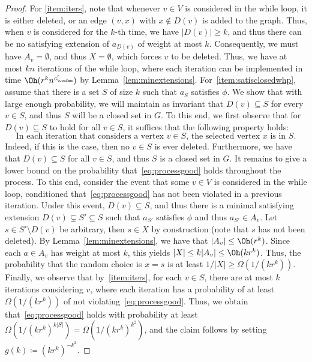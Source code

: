 \begin{proof}
For \ref{item:iters}, note that whenever $v\in V$ is considered in the while loop, it is either deleted, or an edge $(v,x)$ with $x\notin D(v)$ is added to the graph. Thus, when $v$ is considered for the $k$-th time, we have $|D(v)|\ge k$, and thus there can be no satisfying extension of $a_{D(v)}$ of weight at most $k$. Consequently, we must have $A_v=\emptyset$, and thus $X=\emptyset$, which forces $v$ to be deleted. Thus, we have at most $kn$ iterations of the while loop, where each iteration can be implemented in time $\Oh(r^k n^{c'_\confam})$ by Lemma~\ref{lem:minextensions}.
%
For~\ref{item:satisclosedwhp}, assume that there is a set $S$ of size $k$ such that $a_S$ satisfies $\phi$. We show that with large enough probability, we will maintain as invariant that $D(v)\subseteq S$ for every $v\in S$, and thus $S$ will be a closed set in $G$. To this end, we first observe that for $D(v) \subseteq S$ to hold for all $v\in S$, it suffices that the following property holds:
\begin{equation}\label{eq:processgood}
\text{In each iteration that considers a vertex $v\in S$, the selected vertex $x$ is in $S$.}
\end{equation}
Indeed, if this is the case, then no $v\in S$ is ever deleted. Furthermore, we have that $D(v)\subseteq S$ for all $v\in S$, and thus $S$ is a closed set in $G$. It remains to give a lower bound on the probability that~\eqref{eq:processgood} holds throughout the process.
%
To this end, consider the event that some $v\in V$ is considered in the while loop, conditioned that~\eqref{eq:processgood} has not been violated in a previous iteration. Under this event, $D(v) \subseteq S$, and thus there is a minimal satisfying extension $D(v) \subsetneq S' \subseteq S$ such that $a_{S'}$ satisfies $\phi$ and thus $a_{S'}\in A_v$. Let $s\in S'\setminus D(v)$ be arbitrary, then $s\in X$ by construction (note that $s$ has not been deleted). By Lemma~\ref{lem:minextensions}, we have that $|A_v| \le \Oh(r^k)$. Since each $a\in A_v$ has weight at most $k$, this yields $|X|\le k|A_v|\le \Oh(k r^k)$. Thus, the probability that the random choice is $x=s$ is at least $1/|X|\ge \Omega(1/(kr^k))$. Finally, we observe that by~\ref{item:iters}, for each $v\in S$, there are at most $k$ iterations considering $v$, where each iteration has a probability of at least $\Omega(1/(kr^k))$ of not violating~\eqref{eq:processgood}. Thus, we obtain that~\eqref{eq:processgood} holds with probability at least $\Omega(1/(kr^k)^{k|S|}) = \Omega(1/(kr^k)^{k^2})$, and the claim follows by setting $g(k) \coloneqq (kr^k)^{-k^2}$.

\end{proof}
